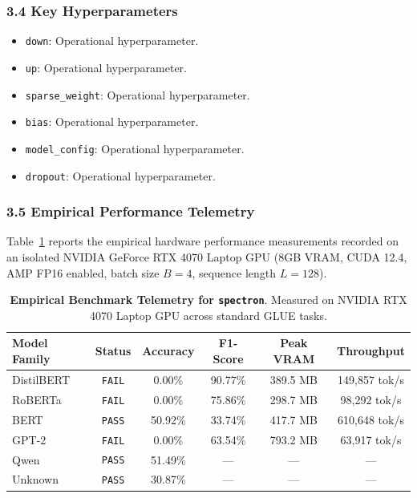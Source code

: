 \subsubsection*{3.4 Key Hyperparameters}
\begin{itemize}
    \item \texttt{down}: Operational hyperparameter.
    \item \texttt{up}: Operational hyperparameter.
    \item \texttt{sparse\_weight}: Operational hyperparameter.
    \item \texttt{bias}: Operational hyperparameter.
    \item \texttt{model\_config}: Operational hyperparameter.
    \item \texttt{dropout}: Operational hyperparameter.
\end{itemize}

\subsubsection*{3.5 Empirical Performance Telemetry}
Table~\ref{tab:telemetry_spectron} reports the empirical hardware performance measurements recorded on an isolated NVIDIA GeForce RTX 4070 Laptop GPU (8GB VRAM, CUDA 12.4, AMP FP16 enabled, batch size $B=4$, sequence length $L=128$).

\begin{table}[h]
\centering
\small
\caption{\textbf{Empirical Benchmark Telemetry for \texttt{spectron}}. Measured on NVIDIA RTX 4070 Laptop GPU across standard GLUE tasks.}
\label{tab:telemetry_spectron}
\begin{tabular*}{\columnwidth}{@{\extracolsep{\fill}}lccccc}
\toprule
\textbf{Model Family} & \textbf{Status} & \textbf{Accuracy} & \textbf{F1-Score} & \textbf{Peak VRAM} & \textbf{Throughput} \\
\midrule
DistilBERT & \texttt{FAIL} & 0.00\% & 90.77\% & 389.5 MB & 149,857 tok/s \\
RoBERTa & \texttt{FAIL} & 0.00\% & 75.86\% & 298.7 MB & 98,292 tok/s \\
BERT & \texttt{PASS} & 50.92\% & 33.74\% & 417.7 MB & 610,648 tok/s \\
GPT-2 & \texttt{FAIL} & 0.00\% & 63.54\% & 793.2 MB & 63,917 tok/s \\
Qwen & \texttt{PASS} & 51.49\% & --- & --- & --- \\
Unknown & \texttt{PASS} & 30.87\% & --- & --- & --- \\
\bottomrule
\end{tabular*}
\end{table}

